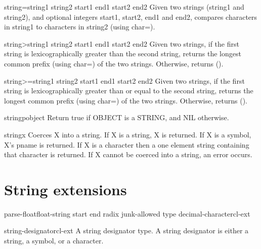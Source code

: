 \begin{function}{string=}{string1 string2 \key start1 end1 start2 end2}{}{}
  Given two strings (string1 and string2), and optional integers start1,
  start2, end1 and end2, compares characters in string1 to characters in
  string2 (using char=).
\end{function}

\begin{function}{string>}{string1 string2 \key start1 end1 start2 end2}{}{}
  Given two strings, if the first string is lexicographically greater than
  the second string, returns the longest common prefix (using char=)
  of the two strings. Otherwise, returns ().
\end{function}

\begin{function}{string>=}{string1 string2 \key start1 end1 start2 end2}{}{}
  Given two strings, if the first string is lexicographically greater
  than or equal to the second string, returns the longest common prefix
  (using char=) of the two strings. Otherwise, returns ().
\end{function}

\begin{function}{stringp}{object}{}{}
  Return true if OBJECT is a STRING, and NIL otherwise.
\end{function}

\begin{class}{string}{x}{}{}
  Coerces X into a string. If X is a string, X is returned. If X is a
   symbol, X's pname is returned. If X is a character then a one element
   string containing that character is returned. If X cannot be coerced
   into a string, an error occurs.
\end{class}

\section{String extensions}
\label{sec:string-extensions}

\begin{function}{parse-float}{float-string \key start end radix junk-allowed type decimal-character}{cl-ext}{}
\end{function}

\begin{type}{string-designator}{}{cl-ext}{}
  A string designator type. A string designator is either a string, a
  symbol, or a character.
\end{type}


